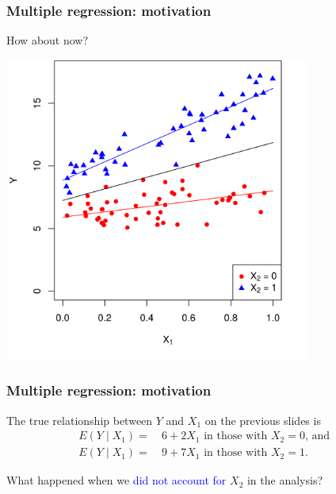 \documentclass[12pt, 
hyperref={colorlinks=true, linkcolor=blue, urlcolor=cyan},dvipsnames]{beamer}
\begin{document}
\begin{frame}
\frametitle{Multiple regression: motivation}
How about now?

\centering
\includegraphics[width=0.75\textwidth]{plots/effect_modification_colored_with_lines.png}

\end{frame}

\begin{frame}
\frametitle{Multiple regression: motivation}
The true relationship between $Y$ and $X_1$ on the previous slides is 
\begin{align*}
E(Y \mid X_1) =& \ 6 + 2 X_1 \text{ in those with $X_2 = 0$, and } \\
E(Y \mid X_1) =& \ 9 + 7 X_1 \text{ in those with $X_2 = 1$}.
\end{align*}

What happened when we \textcolor{blue}{did not account for} $X_2$ in the analysis? 
\end{frame}
\end{document}
